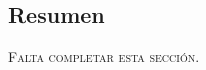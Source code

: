 \subsection{Resumen}

{\Large\Bold\scshape Falta completar esta sección.}\\

\lipsum[1]\\

\lipsum[2]\\